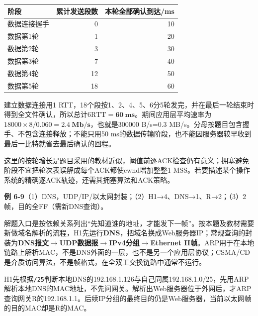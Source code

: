 \documentclass{sidenotes-simplex}
\begin{document}
\begin{longtable}[]{@{}lrr@{}}
\toprule\noalign{}
阶段 & 累计发送段数 & 本轮全部确认到达/ms \\
\midrule\noalign{}
\endhead
\bottomrule\noalign{}
\endlastfoot
数据连接握手 & 0 & 10 \\
数据第1轮 & 1 & 20 \\
数据第2轮 & 3 & 30 \\
数据第3轮 & 7 & 40 \\
数据第4轮 & 12 & 50 \\
数据第5轮 & 18 & 60 \\
\end{longtable}

建立数据连接用1 RTT，18个段按1、2、4、5、6分5轮发完，并在最后一轮结束时得到全文件确认，所以总计\(6\mathrm{RTT}=\mathbf{60\ ms}\)。期间应用层平均速率为\(18000\times8/0.060=\mathbf{2.4\ Mb/s}\)，也就是300000 B/s=0.3 MB/s。分母按题目包含握手、不包含连接释放；不能只用50 ms的数据传输阶段，也不能因服务器较早收到最后一比特就省去最后确认的回程。

这里的按轮增长是题目采用的教材近似，阈值前逐ACK检查仍有意义；拥塞避免阶段不宜把轮次表误解成每个ACK都使cwnd增加整整1 MSS。若要描述某个操作系统的精确逐ACK轨迹，还需其拥塞算法和ACK策略。

\par\medskip\Needspace{30.00mm}\noindent{}\label{a:CN06-E09}\textbf{例 6-9}\quad （1）DNS，UDP/IP/以太网封装；（2）H1→4、DNS→1、R→2；（3）2帧，目的全FF（需新DNS查询）。
\par\smallskip
解题入口是按依赖关系列出``先知道谁的地址，才能发下一帧''。按本题及教材需要新做域名解析的流程，H1先运行\textbf{DNS}，把域名换成Web服务器IP；常规查询的封装为\textbf{DNS报文\ensuremath{\to}UDP数据报\ensuremath{\to}IPv4分组\ensuremath{\to}Ethernet II帧}。ARP用于在本地链路上解析MAC，不是DNS外面的一层，也不是另一个应用层协议；CSMA/CD是介质访问算法，不是帧格式，在全双工交换链路中通常不运行。

H1先根据\texttt{/25}判断本地DNS的192.168.1.126与自己同属192.168.1.0/25，先用ARP解析本地DNS的MAC地址，不先问网关。解析出Web服务器位于外网后，才ARP查询网关R的192.168.1.1。后续IP分组的最终目的仍是Web服务器，当前以太网帧的目的MAC却是R的MAC。
\end{document}
